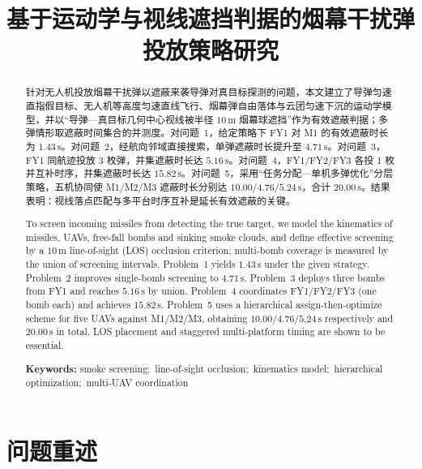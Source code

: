 \documentclass[withoutpreface,bwprint]{cumcmthesis}
\title{基于运动学与视线遮挡判据的烟幕干扰弹投放策略研究}
\begin{document}
\maketitle

\begin{abstract}
针对无人机投放烟幕干扰弹以遮蔽来袭导弹对真目标探测的问题，本文建立了导弹匀速直指假目标、无人机等高度匀速直线飞行、烟幕弹自由落体与云团匀速下沉的运动学模型，并以“导弹—真目标几何中心视线被半径 $10\,\mathrm{m}$ 烟幕球遮挡”作为有效遮蔽判据；多弹情形取遮蔽时间集合的并测度。对问题~1，给定策略下 FY1 对 M1 的有效遮蔽时长为 $1.43\,\mathrm{s}$。对问题~2，经航向邻域直接搜索，单弹遮蔽时长提升至 $4.71\,\mathrm{s}$。对问题~3，FY1 同航迹投放 3 枚弹，并集遮蔽时长达 $5.16\,\mathrm{s}$。对问题~4，FY1/FY2/FY3 各投 1 枚并互补时序，并集遮蔽时长达 $15.82\,\mathrm{s}$。对问题~5，采用“任务分配—单机多弹优化”分层策略，五机协同使 M1/M2/M3 遮蔽时长分别达 $10.00/4.76/5.24\,\mathrm{s}$，合计 $20.00\,\mathrm{s}$。结果表明：视线落点匹配与多平台时序互补是延长有效遮蔽的关键。

\end{abstract}

\renewcommand{\abstractname}{Abstract}
\begin{abstract}
To screen incoming missiles from detecting the true target, we model the kinematics of missiles, UAVs, free-fall bombs and sinking smoke clouds, and define effective screening by a $10\,\mathrm{m}$ line-of-sight (LOS) occlusion criterion; multi-bomb coverage is measured by the union of screening intervals. Problem~1 yields $1.43\,\mathrm{s}$ under the given strategy. Problem~2 improves single-bomb screening to $4.71\,\mathrm{s}$. Problem~3 deploys three bombs from FY1 and reaches $5.16\,\mathrm{s}$ by union. Problem~4 coordinates FY1/FY2/FY3 (one bomb each) and achieves $15.82\,\mathrm{s}$. Problem~5 uses a hierarchical assign-then-optimize scheme for five UAVs against M1/M2/M3, obtaining $10.00/4.76/5.24\,\mathrm{s}$ respectively and $20.00\,\mathrm{s}$ in total. LOS placement and staggered multi-platform timing are shown to be essential.

\noindent\textbf{Keywords:} smoke screening;\ line-of-sight occlusion;\ kinematics model;\ hierarchical optimization;\ multi-UAV coordination
\end{abstract}
\renewcommand{\abstractname}{摘要}

\newpage
\listoffigures
\listoftables
\newpage

\section{问题重述}
\end{document}
